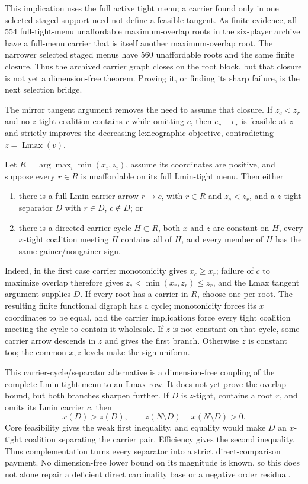 \documentclass[11pt]{article}
\newcommand{\Lmax}{\operatorname{Lmax}}
\begin{document}
This implication uses the full active tight menu; a carrier found only in one
selected staged support need not define a feasible tangent.  As finite
evidence, all 554 full-tight-menu unaffordable maximum-overlap roots in the
six-player archive have a full-menu carrier that is itself another
maximum-overlap root.  The narrower selected staged menus have 560
unaffordable roots and the same finite closure.  Thus the archived carrier
graph closes on the root block, but that closure is not yet a dimension-free
theorem.  Proving it, or finding its sharp failure, is the next selection
bridge.

The mirror tangent argument removes the need to assume that closure.  If
$z_c<z_r$ and no $z$-tight coalition contains $r$ while omitting $c$, then
$e_c-e_r$ is feasible at $z$ and strictly improves the decreasing
lexicographic objective, contradicting $z=\Lmax(v)$.

Let $R=\arg\max_i\min(x_i,z_i)$, assume its coordinates are positive, and
suppose every $r\in R$ is unaffordable on its full Lmin-tight menu.  Then
either
\begin{enumerate}[label=(\roman*)]
\item there is a full Lmin carrier arrow $r\to c$, with $r\in R$ and
$z_c<z_r$, and a $z$-tight separator $D$ with $r\in D$, $c\notin D$; or
\item there is a directed carrier cycle $H\subset R$, both $x$ and $z$ are
constant on $H$, every $x$-tight coalition meeting $H$ contains all of $H$,
and every member of $H$ has the same gainer/nongainer sign.
\end{enumerate}
Indeed, in the first case carrier monotonicity gives $x_c\ge x_r$; failure of
$c$ to maximize overlap therefore gives
$z_c<\min(x_r,z_r)\le z_r$, and the Lmax tangent argument supplies $D$.  If
every root has a carrier in $R$, choose one per root.  The resulting finite
functional digraph has a cycle; monotonicity forces its $x$ coordinates to
be equal, and the carrier implications force every tight coalition meeting
the cycle to contain it wholesale.  If $z$ is not constant on that cycle,
some carrier arrow descends in $z$ and gives the first branch.  Otherwise
$z$ is constant too; the common $x,z$ levels make the sign uniform.

This carrier-cycle/separator alternative is a dimension-free coupling of the
complete Lmin tight menu to an Lmax row.  It does not yet prove the overlap
bound, but both branches sharpen further.  If $D$ is $z$-tight, contains a
root $r$, and omits its Lmin carrier $c$, then
\[
 x(D)>z(D),\qquad z(N\setminus D)-x(N\setminus D)>0. \tag{SCP}
\]
Core feasibility gives the weak first inequality, and equality would make
$D$ an $x$-tight coalition separating the carrier pair.  Efficiency gives
the second inequality.  Thus complementation turns every separator into a
strict direct-comparison payment.  No dimension-free lower bound on its
magnitude is known, so this does not alone repair a deficient direct
cardinality base or a negative order residual.
\end{document}
